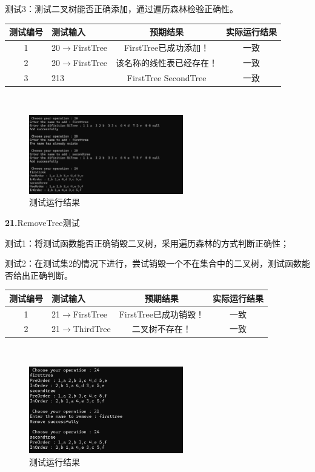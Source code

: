 \documentclass[supercite]{Experimental_Report}
\theoremstyle{definition}
\begin{document}
测试3：测试二叉树能否正确添加，通过遍历森林检验正确性。

\vspace{0.5em}

\begin{tabular}{|c|p{2.7cm}|c|c|}
	\hline
	测试编号 & 测试输入 & 预期结果 & 实际运行结果 \\
	\hline
	1 & 20$\rightarrow$FirstTree & FirstTree已成功添加！ & 一致 \\
	\hline
	2 & 20$\rightarrow$FirstTree & 该名称的线性表已经存在！ & 一致 \\
	\hline
	3 & 213& FirstTree SecondTree & 一致 \\
	\hline
\end{tabular}

~\

\begin{figure}[H]
 	\centering
 	\includegraphics[width=0.6\textwidth]{images/二叉树测试20.png}
 	\caption{测试运行结果}
 	\label{txlab}
 \end{figure}

\noindent\textbf{21.}RemoveTree测试

测试1：将测试函数能否正确销毁二叉树，采用遍历森林的方式判断正确性；

测试2：在测试集2的情况下进行，尝试销毁一个不在集合中的二叉树，测试函数能否给出正确判断。

\vspace{0.5em}

\begin{tabular}{|c|p{2.7cm}|c|c|}
	\hline
	测试编号 & 测试输入 & 预期结果 & 实际运行结果 \\
	\hline
	1 & 21$\rightarrow$FirstTree & FirstTree已成功销毁！ & 一致 \\
	\hline
	2 & 21$\rightarrow$ThirdTree & 二叉树不存在！ & 一致 \\
	\hline
\end{tabular}

~\

\begin{figure}[H]
 	\centering
 	\includegraphics[width=0.6\textwidth]{images/二叉树测试21.png}
 	\caption{测试运行结果}
 	\label{txlab}
 \end{figure}
\end{document}
